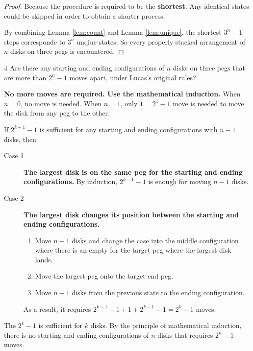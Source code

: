 \documentclass[a4paper,12pt]{article}
\makeatletter
\newtheorem*{solution}{Solution}
\theoremstyle{definition}
\renewenvironment{solution}[1][Solution] {\par\pushQED{\qed}\normalfont\topsep6\p@\@plus6\p@\relax\trivlist\item[\hskip\labelsep\bfseries#1\@addpunct{.}]\ignorespaces}{\popQED\endtrivlist\@endpefalse} \makeatother
\newenvironment{problems}{\begin{list}{}{\renewcommand{\makelabel}[1]{\textbf{##1}\hfil}}}{\end{list}}
\makeatother
\begin{document}
\begin{problems}
\begin{proof}
        Because the procedure is required to be the \textbf{shortest}. Any identical states could be skipped in order to obtain a shorter process.

        By combining Lemma \ref{lem:count} and Lemma \ref{lem:unique}, the shortest $3^n-1$ steps corresponde to $3^n$ unqiue states. So every properly stacked arrangement of $n$ disks on three pegs is encountered.
    \end{proof}

    \item[4] Are there any starting and ending configurations of $n$ disks on three pegs that are more than $2^n-1$ moves apart, under Lucas's original rules?

    \begin{solution}
        \textbf{No more moves are required. Use the mathematical induction.} When $n=0$, no move is needed. When $n=1$, only $1=2^1-1$ move is needed to move the disk from any peg to the other.

        If $2^{k-1}-1$ is sufficient for any starting and ending configurations with $n-1$ disks, then 
        \begin{description}
            \item[Case 1] \textbf{The largest disk is on the same peg for the starting and ending configurations.} By induction, $2^{k-1}-1$ is enough for moving $n-1$ disks.
            \item[Case 2] \textbf{The largest disk changes its position between the starting and ending configurations.} 

            \begin{enumerate}
                \item Move $n-1$ disks and change the case into the middle configuration where there is an empty for the target peg where the largest disk lands.
                \item Move the largest peg onto the target end peg.
                \item Move $n-1$ disks from the previous state to the ending configuration.
            \end{enumerate}

            As a result, it requires $2^{k-1}-1+1+2^{k-1}-1=2^k-1$ moves.
        \end{description}
        The $2^k-1$ is sufficient for $k$ disks. By the principle of mathematical induction, there is no starting and ending configurations of $n$ disks that requires $2^n-1$ moves.
    \end{solution}


\end{problems}
\end{document}
